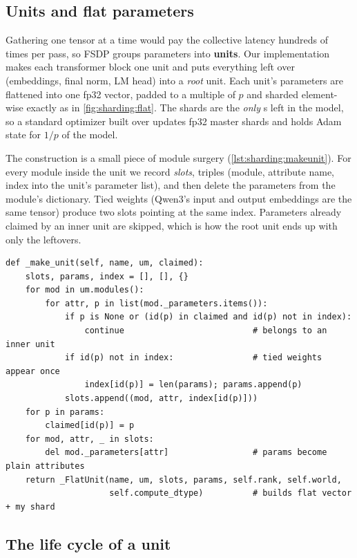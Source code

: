 \subsection{Units and flat parameters}

Gathering one tensor at a time would pay the collective latency hundreds of times per pass, so
FSDP groups parameters into \textbf{units}. Our implementation makes each transformer block one
unit and puts everything left over (embeddings, final norm, LM head) into a \emph{root} unit. Each
unit's parameters are flattened into one fp32 vector, padded to a multiple of $p$ and sharded
element-wise exactly as in \cref{fig:sharding:flat}. The shards are the \emph{only}
s left in the model, so a standard optimizer built over
 updates fp32 master shards and holds Adam state for $1/p$ of the model.

The construction is a small piece of module surgery (\cref{lst:sharding:makeunit}). For every
module inside the unit we record \emph{slots}, triples (module, attribute name, index into the
unit's parameter list), and then delete the parameters from the module's
 dictionary. Tied weights (Qwen3's input and output embeddings are the same
tensor) produce two slots pointing at the same index. Parameters already claimed by an inner unit
are skipped, which is how the root unit ends up with only the leftovers.

\begin{lstlisting}[caption={Turning a submodule into an FSDP unit (abridged).},label={lst:sharding:makeunit}]
def _make_unit(self, name, um, claimed):
    slots, params, index = [], [], {}
    for mod in um.modules():
        for attr, p in list(mod._parameters.items()):
            if p is None or (id(p) in claimed and id(p) not in index):
                continue                          # belongs to an inner unit
            if id(p) not in index:                # tied weights appear once
                index[id(p)] = len(params); params.append(p)
            slots.append((mod, attr, index[id(p)]))
    for p in params:
        claimed[id(p)] = p
    for mod, attr, _ in slots:
        del mod._parameters[attr]                 # params become plain attributes
    return _FlatUnit(name, um, slots, params, self.rank, self.world,
                     self.compute_dtype)          # builds flat vector + my shard
\end{lstlisting}

\subsection{The life cycle of a unit}

